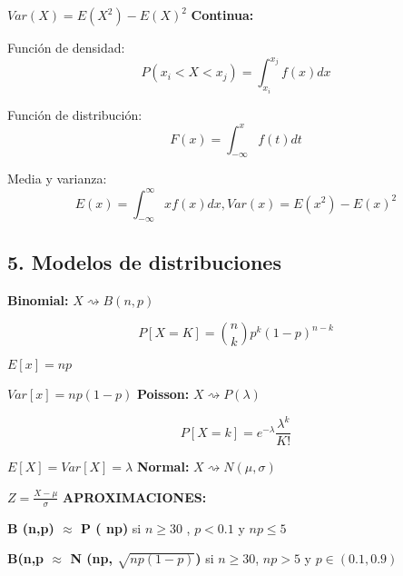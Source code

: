 \documentclass[12pt,a4paper]{report}
\begin{document}
$Var(X) = E(X ^ 2 ) - E (X) ^ 2$
\newline
\newline
\textbf{Continua: }
\newline

Función de densidad:
\[ P(x_i < X < x _ j) = \int _ {x _ i} ^ {x _ j} f(x) dx  \]

Función de distribución:
\[ F(x) = \int _ { - \infty} ^ x f(t)dt\]

Media y varianza:
\[ E(x) = \int _ {- \infty} ^ {\infty} x f(x)dx , Var (x) = E(x^ 2) - E(x) ^ 2\]

\newpage
\subsection*{5. Modelos de distribuciones }
\textbf{Binomial: } $ X \rightsquigarrow B(n, p) $

\[ P [X = K ] = \binom {n}{k} p ^k (1 - p) ^ {n - k} \]

$ E[x] = np $
\newline

$ Var[x] = np (1 - p ) $
\newline
\newline
\newline
\newline
\textbf{Poisson: } $X \rightsquigarrow P (\lambda) $

\[ P[ X = k ] = e ^ {-\lambda} \frac{\lambda ^ k }{ K ! } \]

$ E [X] = Var [X] = \lambda $
\newline
\newline
\newline
\textbf{Normal: } $ X \rightsquigarrow N (\mu, \sigma) $
\newline

$ Z = \frac{X - \mu}{\sigma} $
                                                 \newline
\newline
\newline
\newline
\textbf{APROXIMACIONES: }
\newline

\textbf{B (n,p) $\approx$ P ( np)} si $ n \geqslant 30$ , $ p < 0.1$ y $ np \leqslant 5$
\newline

\textbf{B(n,p $\approx $ N (np, $\sqrt{np(1-p)}$)} si $ n \geqslant 30 $, $  np > 5$ y $p \in (0.1 , 0.9) $ 
\newline
\end{document}
